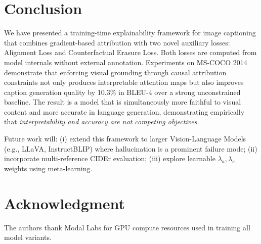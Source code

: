 \documentclass[conference]{IEEEtran}
\begin{document}
\section{Conclusion}
\label{sec:conc}

We have presented a training-time explainability framework for image captioning that combines gradient-based attribution with two novel auxiliary losses: Alignment Loss and Counterfactual Erasure Loss. Both losses are computed from model internals without external annotation. Experiments on MS-COCO 2014 demonstrate that enforcing visual grounding through causal attribution constraints not only produces interpretable attention maps but also improves caption generation quality by 10.3\% in BLEU-4 over a strong unconstrained baseline. The result is a model that is simultaneously more faithful to visual content and more accurate in language generation, demonstrating empirically that \textit{interpretability and accuracy are not competing objectives}.

Future work will: (i) extend this framework to larger Vision-Language Models (e.g., LLaVA, InstructBLIP) where hallucination is a prominent failure mode; (ii) incorporate multi-reference CIDEr evaluation; (iii) explore learnable $\lambda_a, \lambda_c$ weights using meta-learning.

\section*{Acknowledgment}

The authors thank Modal Labs for GPU compute resources used in training all model variants.
\end{document}
